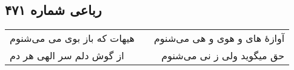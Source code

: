 \begin{center}
\section*{رباعی شماره ۴۷۱}
\label{sec:sh471}
\begin{longtable}{l p{0.5cm} r}
هیهات که باز بوی می می‌شنوم
&&
آوازهٔ های و هوی و هی می‌شنوم
\\
از گوش دلم سر الهی هر دم
&&
حق میگوید ولی ز نی می‌شنوم
\\
\end{longtable}
\end{center}
